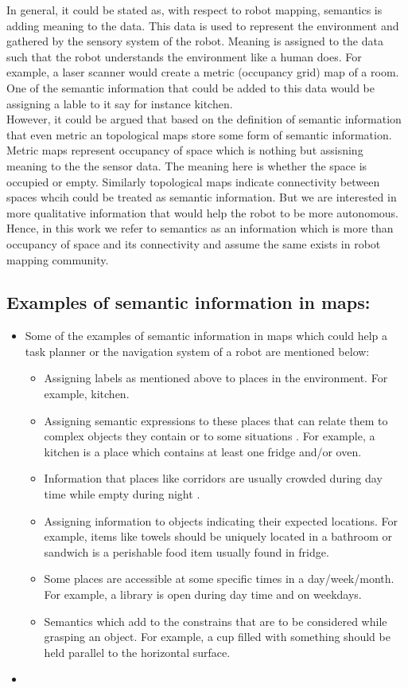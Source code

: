 In general, it could be stated as, with respect to robot mapping, semantics is adding meaning to the data.
This data is used to represent the environment and gathered by the sensory system of the robot.
Meaning is assigned to the data such that the robot understands the environment like a human does.
For example, a laser scanner would create a metric (occupancy grid) map of a room. One of the semantic information that could be added to this data
would be assigning a lable to it say for instance kitchen.\\

However, it could be argued that based on the definition of semantic information that even metric an topological maps store some form of semantic information.
Metric maps represent occupancy of space which is nothing but assisning meaning to the the sensor data.
The meaning here is whether the space is occupied or empty.
Similarly topological maps indicate connectivity between spaces whcih could be treated as semantic information.
But we are interested in more qualitative information that would help the robot to be more autonomous.
Hence, in this work we refer to semantics as an information which is more than occupancy of space and its connectivity and assume the same exists in robot mapping community.

 \subsection{Examples of semantic information in maps:}
  \begin{itemize}
  \item Some of the examples of semantic information in maps which could help a task planner or the navigation system of a robot are mentioned below: 
    \begin{itemize}
      \item Assigning labels as mentioned above to places in the environment. For example, kitchen.
      \item Assigning semantic expressions to these places that can relate them to complex objects they contain or to some situations \cite{7} . 
      For example, a kitchen is a place which contains at least one fridge and/or oven. 
      \item Information that places like corridors are usually crowded during day time while empty during night \cite{4}.
      \item Assigning information to objects indicating their expected locations. For example, items like towels should be uniquely located in a bathroom \cite{2} 
      or sandwich is a perishable food item usually found in fridge.
      \item Some places are accessible at some specific times in a day/week/month. For example, a library is open during day time and on weekdays.
      \item Semantics which add to the constrains that are to be considered while grasping an object. For example, a cup filled with something should be held parallel to the horizontal surface. 
    \end{itemize}  
  \item
 \end{itemize}

